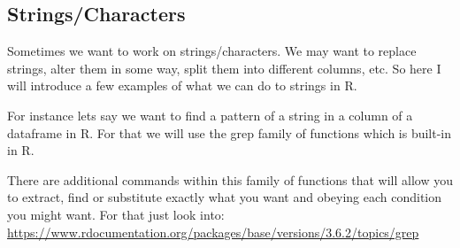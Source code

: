 \documentclass[
]{book}
\newenvironment{Shaded}{\begin{snugshade}}{\end{snugshade}}
\newcommand{\AttributeTok}[1]{\textcolor[rgb]{0.77,0.63,0.00}{#1}}
\newcommand{\CommentTok}[1]{\textcolor[rgb]{0.56,0.35,0.01}{\textit{#1}}}
\newcommand{\ConstantTok}[1]{\textcolor[rgb]{0.00,0.00,0.00}{#1}}
\newcommand{\FunctionTok}[1]{\textcolor[rgb]{0.00,0.00,0.00}{#1}}
\newcommand{\NormalTok}[1]{#1}
\newcommand{\SpecialCharTok}[1]{\textcolor[rgb]{0.00,0.00,0.00}{#1}}
\newcommand{\StringTok}[1]{\textcolor[rgb]{0.31,0.60,0.02}{#1}}
\begin{document}
\hypertarget{stringscharacters}{%
\subsection{Strings/Characters}\label{stringscharacters}}

Sometimes we want to work on strings/characters.
We may want to replace strings, alter them in some way, split them into different columns, etc.
So here I will introduce a few examples of what we can do to strings in R.

For instance lets say we want to find a pattern of a string in a column of a dataframe in R.
For that we will use the grep family of functions which is built-in in R.

\begin{Shaded}
\end{Shaded}

There are additional commands within this family of functions that will allow you to extract, find or substitute exactly what you want and obeying each condition you might want.
For that just look into: \url{https://www.rdocumentation.org/packages/base/versions/3.6.2/topics/grep}
\end{document}
